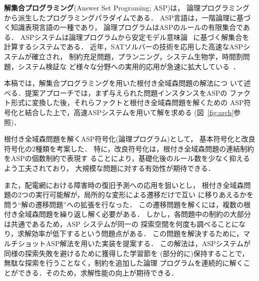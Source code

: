 \textbf{解集合プログラミング}(Answer Set Programing; ASP\cite{%
  Baral03:cambridge,%
  Gelfond88:iclp,%
  Inoue08:jssst,%
  Niemela99:amai})は，
論理プログラミングから派生したプログラミングパラダイムである．
ASP言語は，一階論理に基づく知識表現言語の一種であり，
論理プログラムはASPのルールの有限集合である．
ASPシステムは論理プログラムから安定モデル意味論~\cite{Gelfond88:iclp}
に基づく解集合を計算するシステムである．
近年，SATソルバーの技術を応用した高速なASPシステムが確立され，
制約充足問題，プランニング，システム生物学，時間割問題，システム検証な
ど様々な分野への実用的応用が急速に拡大している~\cite{ASPAISAT}．

本稿では，解集合プログラミングを用いた根付き全域森問題の解法につ
いて述べる．提案アプローチでは，まず与えられた問題インスタンスをASPの
ファクト形式に変換した後，それらファクトと根付き全域森問題を解くための
ASP符号化と結合した上で，高速ASPシステムを用いて解を求める
(図~\ref{fig:arch}参照)．

根付き全域森問題を解くASP符号化(論理プログラム)として，
基本符号化と改良符号化の2種類を考案した．
特に，改良符号化は，根付き全域森問題の連結制約をASPの個数制約で表現す
ることにより，基礎化後のルール数を少なく抑えるよう工夫されており，
大規模な問題に対する有効性が期待できる．

また，配電網における障害時の復旧予測への応用を狙いとし，
根付き全域森問題の2つの実行可能解が，局所的な変形による遷移だけで互い
に移りあえるかを問う``解の遷移問題''への拡張を行なった．
この遷移問題を解くには，複数の根付き全域森問題を繰り返し解く必要がある．
しかし，各問題中の制約の大部分は共通であるため，ASP システムが同一の
探索空間を何度も調べることになり，求解効率が低下するという問題点がある．
この問題を解決するために，マルチショットASP解法を用いた実装を提案する．
この解法は，ASPシステムが同様の探索失敗を避けるために獲得した学習節を
(部分的に)保持することで，無駄な探索を行うことなく，制約を追加した論理
プログラムを連続的に解くことができる．そのため，求解性能の向上が期待できる．

